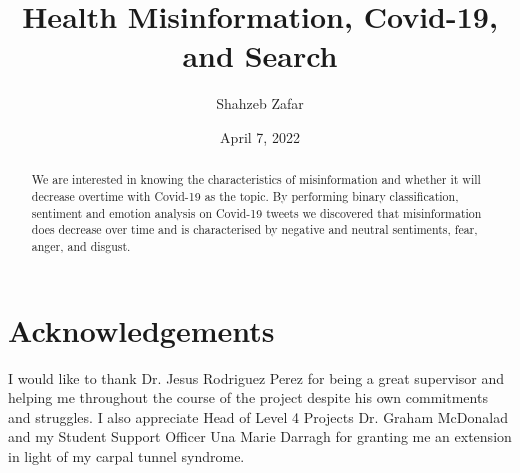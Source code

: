\documentclass{l4proj}
\begin{document}
\title{Health Misinformation, Covid-19, and Search} %
\author{Shahzeb Zafar}
\date{April 7, 2022}

\maketitle

\begin{abstract}
    We are interested in knowing the characteristics of misinformation and whether it will decrease overtime with Covid-19 as the topic. By performing binary classification, sentiment and emotion analysis on Covid-19 tweets we discovered that misinformation does decrease over time and is characterised by negative and neutral sentiments, fear, anger, and disgust.
\end{abstract}

\chapter*{Acknowledgements}
%
%
I would like to thank Dr. Jesus Rodriguez Perez for being a great supervisor and helping me throughout the course of the project despite his own commitments and struggles. I also appreciate Head of Level 4 Projects Dr. Graham McDonalad and my Student Support Officer Una Marie Darragh for granting me an extension in light of my carpal tunnel syndrome.


%
%
%
\educationalconsent
\end{document}
